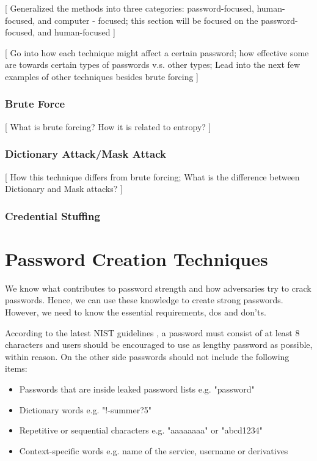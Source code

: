 \documentclass[acmsmall,nonacm]{acmart}
\begin{document}
\textcolor{beaver}{[ Generalized the methods into three categories: password-focused, human-focused, and computer - focused; this section will be focused on the password-focused, and human-focused ]}


\textcolor{beaver}{[ Go into how each technique might affect a certain password; how effective some are towards certain types of passwords v.s. other types; Lead into the next few examples of other techniques besides brute forcing ]}

\subsubsection{Brute Force}

\textcolor{beaver}{[ What is brute forcing? How it is related to entropy? ]}
\cite{pedamkar_2021}

\subsubsection{Dictionary Attack/Mask Attack}
\textcolor{beaver}{[ How this technique differs from brute forcing; What is the difference between Dictionary and Mask attacks? ]}
\cite{contributor_2005}
\cite{hashcat}

\subsubsection{Credential Stuffing}
\cite{mueller_wetter_manico_kingthorin}
\cite{imperva_2020}


\section{Password Creation Techniques} \label{creation}

We know what contributes to password strength  and how adversaries try to crack passwords. Hence, we can use these knowledge to create strong passwords. However, we need to know the essential requirements, dos and don'ts.

According to the latest NIST guidelines \cite{nist_2020}, a password must consist of at least 8 characters and users should be encouraged to use as lengthy password as possible, within reason. On the other side passwords should not include the following items:

\begin{itemize}
\item Passwords that are inside leaked password lists e.g. "password" 
\item Dictionary words e.g. "!-summer?5"
\item Repetitive or sequential characters e.g. "aaaaaaaa" or "abcd1234"
\item Context-specific words e.g. name of the service, username or derivatives
\end{itemize}
\end{document}

